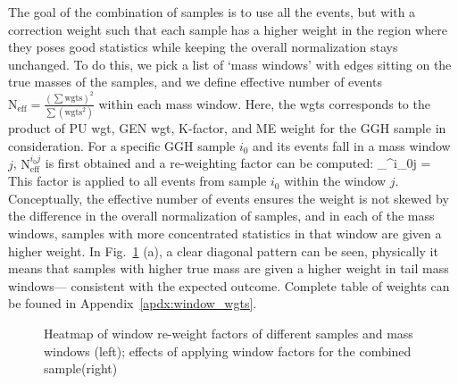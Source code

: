 The goal of the combination of samples is to use all the events, but with a correction weight
such that each sample has a higher weight in the region where they poses good statistics
while keeping the overall normalization stays unchanged. To do this, we pick a list of
`mass windows' with edges sitting on the true masses of the samples, and we define effective
number of events $\mathrm{N}_\mathrm{eff} = \frac{(\sum\mathrm{wgts})^2}{\sum(\mathrm{wgts}^2)}$
within each mass window. Here, the wgts corresponds to the product of PU wgt, GEN wgt, K-factor, and ME weight for
the GGH sample in consideration. For a specific GGH sample $i_0$ and its events fall in a mass 
window $j$, $\mathrm{N}_\mathrm{eff}^{i_0j}$ is first obtained and a re-weighting factor can be computed:
\be
{}_^{i_0j} = 
\ee
This factor is applied to all events from sample $i_0$ within the window $j$. Conceptually,
the effective number of events ensures the weight is not skewed by the difference in the overall
normalization of samples, and in each of the mass windows, samples with more concentrated
statistics in that window are given a higher weight. In Fig.~\ref{fig:window_wgt_matrix} (a), a
clear diagonal pattern can be seen, physically it means that samples with higher true 
mass are given a higher weight in tail mass windows--- consistent with the expected outcome. Complete
table of weights can be founed in Appendix~\ref{apdx:window_wgts}.
\begin{figure}[htb]
    \begin{center}
    \end{center}
    \caption{Heatmap of window re-weight factors of different samples and mass windows (left);
    effects of applying window factors for the combined sample(right)}
    \label{fig:window_wgt_matrix}
\end{figure}

